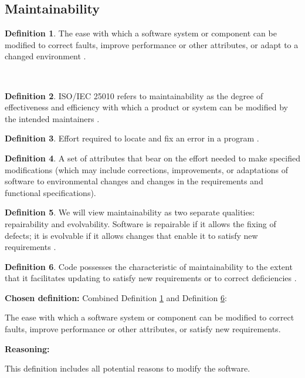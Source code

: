 \documentclass[letterpaper,cleveref]{lipics-v2019}
\theoremstyle{definition}
\newtheorem{defn}{Definition}
\begin{document}
\subsection{Maintainability}
\begin{defn} \label{MaintainabilityDefnSelected1}
The ease with which a software system or component can be modified to correct faults, improve performance or other attributes, or adapt to a changed environment \citep{IEEEStdGlossarySET1990}. 
\end{defn}\
\begin{defn}
ISO/IEC 25010 refers to maintainability as the degree of effectiveness and efficiency with which a product or system can be modified by the intended maintainers \citep{ISO/IEC25010}.
\end{defn}
\begin{defn}
Effort required to locate and fix an error in a program
\citep{pressman2005software}.
\end{defn}
\begin{defn}
A set of attributes that bear on the effort needed to make specified modifications (which may include corrections, improvements, or adaptations of software to environmental changes and changes in the requirements and functional specifications)\citep{pfleeger2006software}.
\end{defn}
\begin{defn}
We will view maintainability as two separate qualities: repairability and evolvability. Software is repairable if it allows the fixing of defects; it is evolvable if it allows changes that enable it to satisfy new requirements \citep{ghezzi1991fundamentals}.
\end{defn}
\begin{defn} \label{MaintainabilityDefnSelected2}
Code possesses the characteristic of maintainability to the extent that it facilitates updating to satisfy new requirements or to correct deficiencies \citep{boehm2007software}.
\end{defn}

\noindent \textbf{Chosen definition:} Combined Definition \ref{MaintainabilityDefnSelected1} and Definition \ref{MaintainabilityDefnSelected2}:

The ease with which a software system or component can be modified to correct faults, improve performance or other attributes, or satisfy new requirements.

\noindent \textbf{Reasoning:}

This definition includes all potential reasons to modify the software. 
\end{document}
